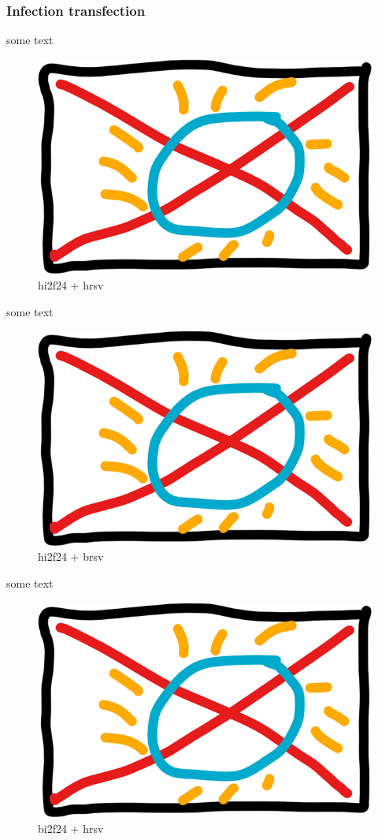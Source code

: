 \subsubsection{Infection transfection}
some text

\begin{figure}
    \centering
    \includegraphics[width=0.5\linewidth]{10. Chapter 5//Figs//04. IFIT2-mutant confocal/00. placeholder.png}
    \caption[hi2f24 + hrsv]{hi2f24 + hrsv}
    \label{hi2f24 + hrsv}
\end{figure}


some text

\begin{figure}
    \centering
    \includegraphics[width=0.5\linewidth]{10. Chapter 5//Figs//04. IFIT2-mutant confocal/00. placeholder.png}
    \caption[hi2f24 + brsv]{hi2f24 + brsv}
    \label{hi2f24 + brsv}
\end{figure}

some text

\begin{figure}
    \centering
    \includegraphics[width=0.5\linewidth]{10. Chapter 5//Figs//04. IFIT2-mutant confocal/00. placeholder.png}
    \caption[bi2f24 + hrsv]{bi2f24 + hrsv}
    \label{bi2f24 + hrsv}
\end{figure}

